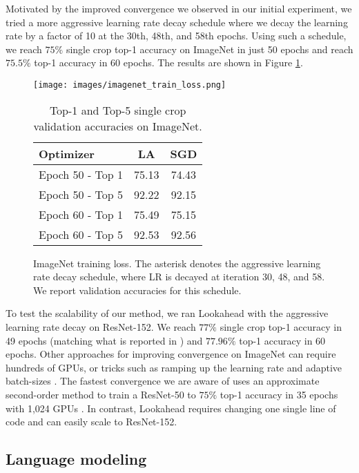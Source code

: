 \documentclass{article}
\begin{document}
Motivated by the improved convergence we observed in our initial experiment, we tried a more aggressive learning rate decay schedule where we decay the learning rate by a factor of 10 at the 30th, 48th, and 58th epochs. Using such a schedule, we reach $75\%$ single crop top-1 accuracy on ImageNet in just 50 epochs and reach $75.5\%$ top-1 accuracy in 60 epochs. The results are shown in Figure \ref{fig:imagenet-visual}.


\begin{figure}[t]
    \centering
    \begin{minipage}{0.48 \linewidth}
    \texttt{[image: images/imagenet\_train\_loss.png]}
    \end{minipage} \hfill
    \begin{minipage}{0.48 \linewidth}
\begin{table}[H]
\label{tabel:imagenet-compare}
\begin{center}
\begin{small}
\begin{sc}
\begin{tabular}{l c c }
\toprule
Optimizer & LA & SGD   \\
\midrule
Epoch 50 - Top 1 & 75.13 & 74.43  \\
Epoch 50 - Top 5 & 92.22 & 92.15  \\ 
Epoch 60 - Top 1 & 75.49 & 75.15  \\
Epoch 60 - Top 5 & 92.53 & 92.56  \\ 
\bottomrule
\end{tabular}
\end{sc}
\end{small}
\end{center}
\caption{Top-1 and Top-5 single crop validation accuracies on ImageNet.}
\vskip -0.1in
\end{table}
\end{minipage}
\caption{ImageNet training loss. The asterisk denotes the aggressive learning rate decay schedule, where LR is decayed at iteration 30, 48, and 58. We report validation accuracies for this schedule.}
\vskip -0.1in
\label{fig:imagenet-visual}
    \end{figure}




To test the scalability of our method, we ran Lookahead with the aggressive learning rate decay on ResNet-152. We reach $77\%$ single crop top-1 accuracy in 49 epochs (matching what is reported in \citet{he2016deep}) and $77.96\%$ top-1 accuracy in 60 epochs. Other approaches for improving convergence on ImageNet can require hundreds of GPUs, or tricks such as ramping up the learning rate and adaptive batch-sizes \citep{goyal2017accurate, jia2018highly}. The fastest convergence we are aware of uses an approximate second-order method to train a ResNet-50 to $75\%$ top-1 accuracy in 35 epochs with 1,024 GPUs \citep{1811.12019}. In contrast, Lookahead requires changing one single line of code and can easily scale to ResNet-152.  \subsection{Language modeling}
\label{sec:lm}
\end{document}
